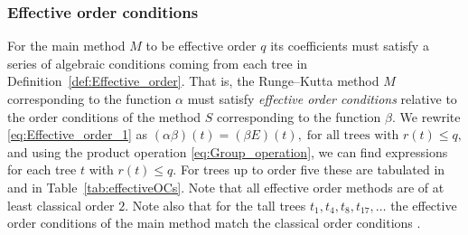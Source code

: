 \subsubsection{Effective order conditions}\label{sec:effOrderCond}

For the main method $M$ to be effective order $q$ its coefficients must satisfy a series of algebraic conditions coming from each tree in Definition~\ref{def:Effective_order}.
That is, the Runge--Kutta method $M$ corresponding to the function $\alpha$ must satisfy
\emph{effective order conditions} relative to the order conditions of the
method $S$ corresponding to the function $\beta$.
We rewrite \eqref{eq:Effective_order_1} as
$
	(\alpha\beta)(t) = (\beta E)(t), \; \text{for all trees with $r(t) \leq q$,}
$
and using the product operation \eqref{eq:Group_operation}, we can find expressions for each tree $t$ with $r(t) \leq q$.
For trees up to order five these are tabulated in \cite[Table~3.89]{Butcher2008_book}
and in Table~\ref{tab:effectiveOCs}.
Note that all effective order methods are of at least classical order $2$.
Note also that for the tall trees $t_1, t_4, t_8, t_{17}, \dots$ the
effective order conditions of the main method match the classical
order conditions \cite{Butcher2008_book}.
